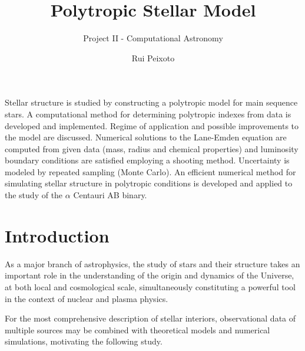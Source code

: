 \documentclass{aa}
\begin{document}
 

   \title{Polytropic Stellar Model}
   
   \subtitle{Project II - Computational Astronomy}

   \author{Rui Peixoto}



 
  \abstract
   {}
   {Stellar structure is studied by constructing a polytropic model for main
     sequence stars. A computational method for determining polytropic indexes
     from data is developed and implemented. Regime of application and possible
     improvements to the model are discussed.}
   {Numerical solutions to the Lane-Emden equation are computed from given data
     (mass, radius and chemical properties) and luminosity boundary conditions
     are satisfied employing a shooting method. Uncertainty is modeled by
     repeated sampling (Monte Carlo).}
   {An efficient numerical method for simulating stellar structure
     in polytropic conditions is developed and applied to the study of the
     $\alpha$ Centauri AB binary.}
   {}

   \maketitle
%

\section{Introduction}

As a major branch of astrophysics, the study of stars and their structure takes
an important role in the understanding of the origin and dynamics of the
Universe, at both local and cosmological scale, simultaneously
constituting a powerful tool in the context of nuclear and plasma physics.

For the most comprehensive description of stellar interiors, observational data
of multiple sources may be combined with theoretical models and numerical
simulations, motivating the following study.
\end{document}
